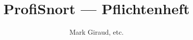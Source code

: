 \documentclass[a4paper]{scrreprt}
\begin{document}
\title{ProfiSnort --- Pflichtenheft}
\author{Mark Giraud, etc.}
\maketitle



\newpage
\tableofcontents
\newpage

















\appendix

\end{document}
